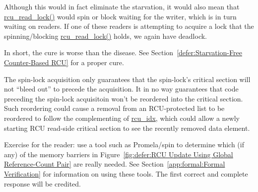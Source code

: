 
	Although this would in fact eliminate the starvation, it would
	also mean that \url{rcu_read_lock()} would spin or block waiting
	for the writer, which is in turn waiting on readers.
	If one of these readers is attempting to acquire a lock that
	the spinning/blocking \url{rcu_read_lock()} holds, we again
	have deadlock.

	In short, the cure is worse than the disease.
	See Section~\ref{defer:Starvation-Free Counter-Based RCU}
	for a proper cure.


	The spin-lock acquisition only guarantees that the spin-lock's
	critical section will not ``bleed out'' to precede the
	acquisition.
	It in no way guarantees that code preceding the spin-lock
	acquisitoin won't be reordered into the critical section.
	Such reordering could cause a removal from an RCU-protected
	list to be reordered to follow the complementing of
	\url{rcu_idx}, which could allow a newly starting RCU
	read-side critical section to see the recently removed
	data element.

	Exercise for the reader: use a tool such as Promela/spin
	to determine which (if any) of the memory barriers in
	Figure~\ref{fig:defer:RCU Update Using Global Reference-Count Pair}
	are really needed.
	See Section~\ref{app:formal:Formal Verification}
	for information on using these tools.
	The first correct and complete response will be credited.



